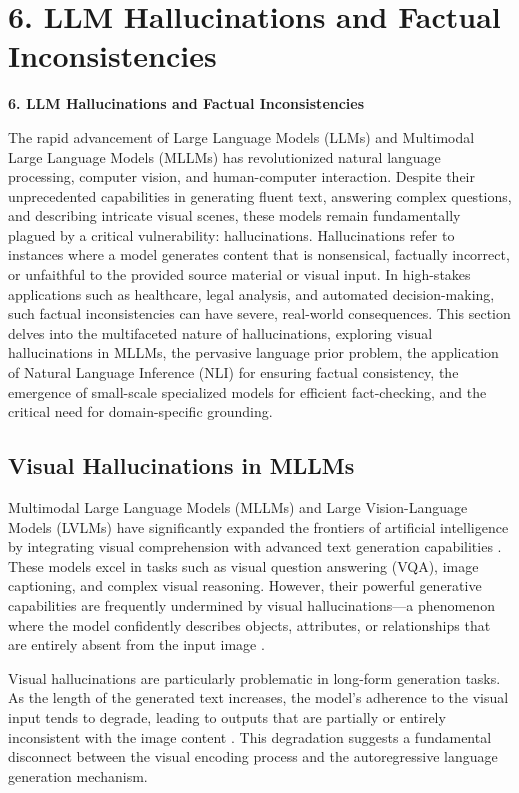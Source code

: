 \documentclass[11pt,a4paper]{article}
\begin{document}
\section{6. LLM Hallucinations and Factual Inconsistencies}

\textbf{6. LLM Hallucinations and Factual Inconsistencies}

The rapid advancement of Large Language Models (LLMs) and Multimodal Large Language Models (MLLMs) has revolutionized natural language processing, computer vision, and human-computer interaction. Despite their unprecedented capabilities in generating fluent text, answering complex questions, and describing intricate visual scenes, these models remain fundamentally plagued by a critical vulnerability: hallucinations. Hallucinations refer to instances where a model generates content that is nonsensical, factually incorrect, or unfaithful to the provided source material or visual input. In high-stakes applications such as healthcare, legal analysis, and automated decision-making, such factual inconsistencies can have severe, real-world consequences. This section delves into the multifaceted nature of hallucinations, exploring visual hallucinations in MLLMs, the pervasive language prior problem, the application of Natural Language Inference (NLI) for ensuring factual consistency, the emergence of small-scale specialized models for efficient fact-checking, and the critical need for domain-specific grounding.

\subsection{Visual Hallucinations in MLLMs}

Multimodal Large Language Models (MLLMs) and Large Vision-Language Models (LVLMs) have significantly expanded the frontiers of artificial intelligence by integrating visual comprehension with advanced text generation capabilities \cite{Morbiato_2025_Grounded}. These models excel in tasks such as visual question answering (VQA), image captioning, and complex visual reasoning. However, their powerful generative capabilities are frequently undermined by visual hallucinations---a phenomenon where the model confidently describes objects, attributes, or relationships that are entirely absent from the input image .

Visual hallucinations are particularly problematic in long-form generation tasks. As the length of the generated text increases, the model's adherence to the visual input tends to degrade, leading to outputs that are partially or entirely inconsistent with the image content . This degradation suggests a fundamental disconnect between the visual encoding process and the autoregressive language generation mechanism.
\end{document}
